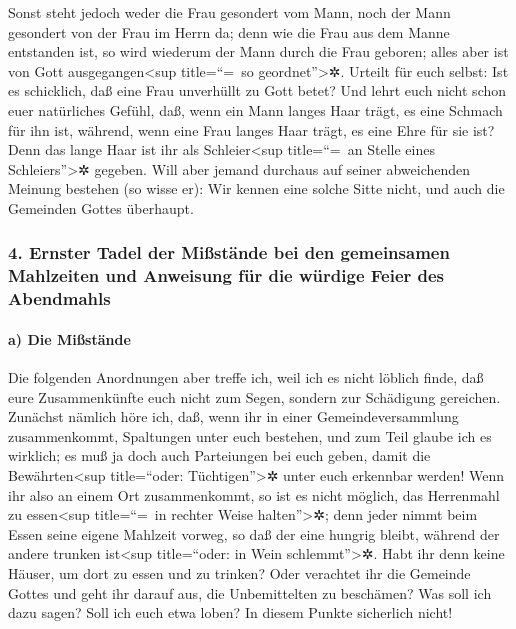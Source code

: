  Sonst steht jedoch weder die Frau gesondert vom Mann,
noch der Mann gesondert von der Frau im Herrn da;  denn
wie die Frau aus dem Manne entstanden ist, so wird wiederum der Mann
durch die Frau geboren; alles aber ist von Gott ausgegangen\textless sup
title=``=~so geordnet''\textgreater✲.  Urteilt für euch
selbst: Ist es schicklich, daß eine Frau unverhüllt zu Gott betet?
 Und lehrt euch nicht schon euer natürliches Gefühl, daß,
wenn ein Mann langes Haar trägt, es eine Schmach für ihn ist,
 während, wenn eine Frau langes Haar trägt, es eine Ehre
für sie ist? Denn das lange Haar ist ihr als Schleier\textless sup
title=``=~an Stelle eines Schleiers''\textgreater✲ gegeben.
 Will aber jemand durchaus auf seiner abweichenden
Meinung bestehen (so wisse er): Wir kennen eine solche Sitte nicht, und
auch die Gemeinden Gottes überhaupt.

\hypertarget{ernster-tadel-der-miuxdfstuxe4nde-bei-den-gemeinsamen-mahlzeiten-und-anweisung-fuxfcr-die-wuxfcrdige-feier-des-abendmahls}{%
\subsubsection{4. Ernster Tadel der Mißstände bei den gemeinsamen
Mahlzeiten und Anweisung für die würdige Feier des
Abendmahls}\label{ernster-tadel-der-miuxdfstuxe4nde-bei-den-gemeinsamen-mahlzeiten-und-anweisung-fuxfcr-die-wuxfcrdige-feier-des-abendmahls}}

\hypertarget{a-die-miuxdfstuxe4nde}{%
\paragraph{a) Die Mißstände}\label{a-die-miuxdfstuxe4nde}}

 Die folgenden Anordnungen aber treffe ich, weil ich es
nicht löblich finde, daß eure Zusammenkünfte euch nicht zum Segen,
sondern zur Schädigung gereichen.  Zunächst nämlich höre
ich, daß, wenn ihr in einer Gemeindeversammlung zusammenkommt,
Spaltungen unter euch bestehen, und zum Teil glaube ich es wirklich;
 es muß ja doch auch Parteiungen bei euch geben, damit
die Bewährten\textless sup title=``oder: Tüchtigen''\textgreater✲ unter
euch erkennbar werden!  Wenn ihr also an einem Ort
zusammenkommt, so ist es nicht möglich, das Herrenmahl zu
essen\textless sup title=``=~in rechter Weise halten''\textgreater✲;
 denn jeder nimmt beim Essen seine eigene Mahlzeit
vorweg, so daß der eine hungrig bleibt, während der andere trunken
ist\textless sup title=``oder: in Wein schlemmt''\textgreater✲.
 Habt ihr denn keine Häuser, um dort zu essen und zu
trinken? Oder verachtet ihr die Gemeinde Gottes und geht ihr darauf aus,
die Unbemittelten zu beschämen? Was soll ich dazu sagen? Soll ich euch
etwa loben? In diesem Punkte sicherlich nicht!

